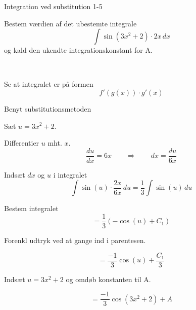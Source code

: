 \documentclass{article}
\begin{document}
\begin{exercise}{Integration ved substitution 1-5}
	
	
	Bestem værdien af det ubestemte integrale
	\[
	\int \sin(3x^2+2) \cdot 2x \, dx
	\]
	og kald den ukendte integrationskonstant for A.
	
	 \\
	
	
	
	\hint
	
	Se at integralet er på formen
	\[
	f'(g(x)) \cdot g'(x)
	\]
	
	\hint
	
	Benyt substitutionsmetoden
	
	\hint
	
	Sæt $u=3x^2+2$.
	
	
	\hint
	
	Differentier $u$ mht. $x$.
	\[
	\frac{du}{dx} = 6x \qquad	\Rightarrow \qquad dx = \frac{du}{6x}
	\]
	
	\hint
	
	Indsæt $dx$ og $u$ i integralet
	\[
	\int \sin(u) \cdot \frac{2x}{6x} \, du = \frac{1}{3} \int \sin(u) \, du
	\]
	
	\hint
	
	Bestem integralet
	\[
	= \frac{1}{3} \left( -\cos(u) + C_1 \right)
	\]
	
	\hint
	Forenkl udtryk ved at gange ind i parentesen.
	
	\hint
	
	\[
	= \frac{-1}{3} \cos(u) + \frac{C_1}{3}
	\]
	
	\hint
	
	Indsæt $u = 3x^2+2$ og omdøb konstanten  til A.
	
	\hint
	
	\[
	= \frac{-1}{3} \cos(3x^2+2) + A
	\]
	
	
\end{exercise}

\newpage
\end{document}
